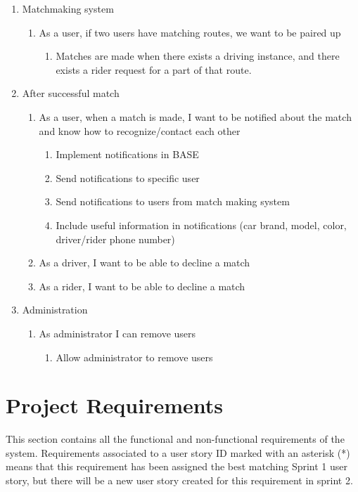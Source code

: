 \documentclass{article}
\begin{document}
\begin{enumerate}
  \item Matchmaking system
  \begin{enumerate}
      \item As a user, if two users have matching routes, we want to be paired up
      \begin{enumerate}
          \item Matches are made when there exists a driving instance, and there exists a rider request for a part of that route.
      \end{enumerate}
  \end{enumerate}
  
  \item After successful match
  \begin{enumerate}
      \item As a user, when a match is made, I want to be notified about the match and know how to recognize/contact each other
      \begin{enumerate}
          \item Implement notifications in BASE
          \item Send notifications to specific user
          \item Send notifications to users from match making system
          \item Include useful information in notifications (car brand, model, color, driver/rider phone number)
      \end{enumerate}
      \item As a driver, I want to be able to decline a match
      \item As a rider, I want to be able to decline a match
  \end{enumerate}
  
  \item Administration
  \begin{enumerate}
      \item As administrator I can remove users
      \begin{enumerate}
          \item Allow administrator to remove users
      \end{enumerate}
  \end{enumerate}
  
\end{enumerate}

\newpage
\section{Project Requirements}
This section contains all the functional and non-functional requirements of the system. Requirements associated to a user story ID marked with an asterisk (*) means that this requirement has been assigned the best matching Sprint 1 user story, but there will be a new user story created for this requirement in sprint 2.
\end{document}
